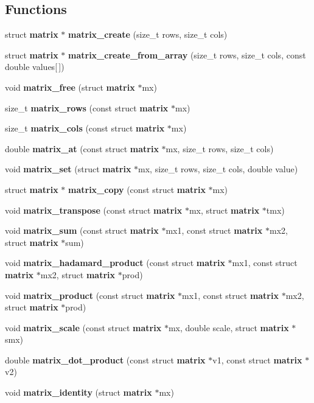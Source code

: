 \subsection*{Functions}
\begin{DoxyCompactItemize}
\item 
struct \textbf{ matrix} $\ast$ \textbf{ matrix\+\_\+create} (size\+\_\+t rows, size\+\_\+t cols)
\item 
struct \textbf{ matrix} $\ast$ \textbf{ matrix\+\_\+create\+\_\+from\+\_\+array} (size\+\_\+t rows, size\+\_\+t cols, const double values[$\,$])
\item 
void \textbf{ matrix\+\_\+free} (struct \textbf{ matrix} $\ast$mx)
\item 
size\+\_\+t \textbf{ matrix\+\_\+rows} (const struct \textbf{ matrix} $\ast$mx)
\item 
size\+\_\+t \textbf{ matrix\+\_\+cols} (const struct \textbf{ matrix} $\ast$mx)
\item 
double \textbf{ matrix\+\_\+at} (const struct \textbf{ matrix} $\ast$mx, size\+\_\+t rows, size\+\_\+t cols)
\item 
void \textbf{ matrix\+\_\+set} (struct \textbf{ matrix} $\ast$mx, size\+\_\+t rows, size\+\_\+t cols, double value)
\item 
struct \textbf{ matrix} $\ast$ \textbf{ matrix\+\_\+copy} (const struct \textbf{ matrix} $\ast$mx)
\item 
void \textbf{ matrix\+\_\+transpose} (const struct \textbf{ matrix} $\ast$mx, struct \textbf{ matrix} $\ast$tmx)
\item 
void \textbf{ matrix\+\_\+sum} (const struct \textbf{ matrix} $\ast$mx1, const struct \textbf{ matrix} $\ast$mx2, struct \textbf{ matrix} $\ast$sum)
\item 
void \textbf{ matrix\+\_\+hadamard\+\_\+product} (const struct \textbf{ matrix} $\ast$mx1, const struct \textbf{ matrix} $\ast$mx2, struct \textbf{ matrix} $\ast$prod)
\item 
void \textbf{ matrix\+\_\+product} (const struct \textbf{ matrix} $\ast$mx1, const struct \textbf{ matrix} $\ast$mx2, struct \textbf{ matrix} $\ast$prod)
\item 
void \textbf{ matrix\+\_\+scale} (const struct \textbf{ matrix} $\ast$mx, double scale, struct \textbf{ matrix} $\ast$smx)
\item 
double \textbf{ matrix\+\_\+dot\+\_\+product} (const struct \textbf{ matrix} $\ast$v1, const struct \textbf{ matrix} $\ast$v2)
\item 
void \textbf{ matrix\+\_\+identity} (struct \textbf{ matrix} $\ast$mx)

\end{DoxyCompactItemize}
